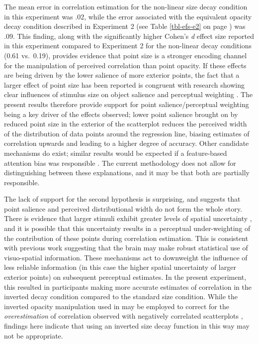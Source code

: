 \documentclass[../main.tex]{subfiles}
\begin{document}
The mean error in correlation estimation for the non-linear size decay
condition in this experiment was .02, while the error associated with
the equivalent opacity decay condition described in Experiment 2 (see
Table \ref{tbl-efs-e2} on page \pageref{tbl-efs-e2}) was .09. This
finding, along with the significantly higher Cohen's \emph{d} effect
size reported in this experiment compared to Experiment 2 for the
non-linear decay conditions (0.61 vs.~0.19), provides evidence that
point size is a stronger encoding channel for the manipulation of
perceived correlation than point opacity. If these effects are being
driven by the lower salience of more exterior points, the fact that a
larger effect of point size has been reported is congruent with research
showing clear influences of stimulus size on object salience and
perceptual weighting \cite{grice_1983, hong_2022, healey_2012}. The
present results therefore provide support for point salience/perceptual
weighting being a key driver of the effects observed; lower point
salience brought on by reduced point size in the exterior of the
scatterplot reduces the perceived width of the distribution of data
points around the regression line, biasing estimates of correlation
upwards and leading to a higher degree of accuracy. Other candidate
mechanisms do exist; similar results would be expected if a
feature-based attention bias was responsible \cite{sun_2016, hong_2022}.
The current methodology does not allow for distinguishing between these
explanations, and it may be that both are partially responsible.

The lack of support for the second hypothesis is surprising, and
suggests that point salience and perceived distributional width do not
form the whole story. There is evidence that larger stimuli exhibit
greater levels of spatial uncertainty \cite{alais_2004}, and it is
possible that this uncertainty results in a perceptual under-weighting
of the contribution of these points during correlation estimation. This
is consistent with previous work \cite{warren_2002, warren_2004}
suggesting that the brain may make robust statistical use of
visuo-spatial information. These mechanisms act to downweight the
influence of less reliable information (in this case the higher spatial
uncertainty of larger exterior points) on subsequent perceptual
estimates. In the present experiment, this resulted in participants
making more accurate estimates of correlation in the inverted decay
condition compared to the standard size condition. While the inverted
opacity manipulation used in  may be
employed to correct for the \emph{overestimation} of correlation
observed with negatively correlated scatterplots \cite{sher_2017},
findings here indicate that using an inverted size decay function in
this way may not be appropriate.
\end{document}
